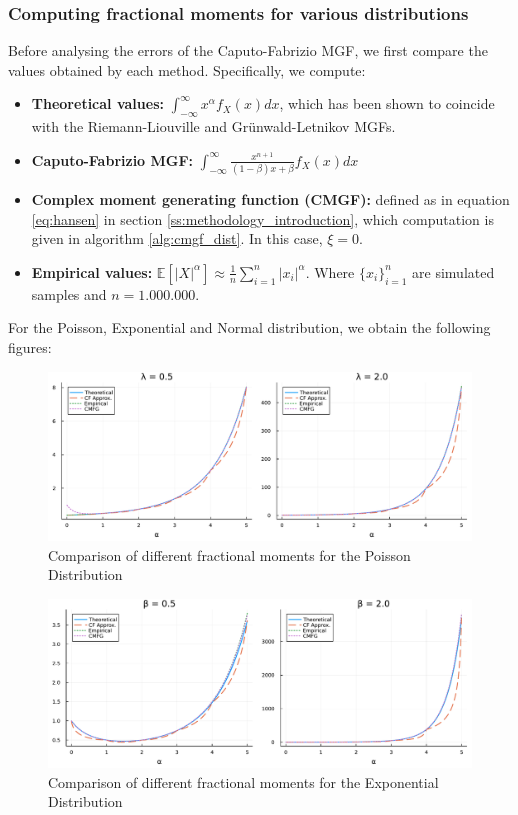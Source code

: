 \subsubsection{Computing fractional moments for various distributions}
Before analysing the errors of the Caputo-Fabrizio MGF, we first compare the values obtained by each method. Specifically, we compute:
\begin{itemize}
    \item \textbf{Theoretical values:} \(\displaystyle \int_{-\infty}^{\infty} x^\alpha  f_X(x) dx\), which has been shown to coincide with the Riemann-Liouville and Grünwald-Letnikov MGFs.
    \item \textbf{Caputo-Fabrizio MGF:} \(\displaystyle \int_{-\infty}^{\infty}  \frac{x^{n+1} }{(1 - \beta)x + \beta} f_X(x) dx\)
    \item \textbf{Complex moment generating function (CMGF):} defined as in equation \ref{eq:hansen} in section \ref{ss:methodology_introduction}, which computation is given in algorithm \ref{alg:cmgf_dist}. In this case, \(\xi = 0\).
    \item \textbf{Empirical values:} \(\displaystyle\mathbb{E}[|X|^\alpha] \approx \frac{1}{n} \sum_{i=1}^{n} |x_i|^\alpha\). Where \(\{x_i\}_{i=1}^{n}\) are simulated samples and \(n = 1.000.000\).
\end{itemize}

For the Poisson, Exponential and Normal distribution, we obtain the following figures: 
\begin{figure}[H]
    \centering
    \includegraphics[width=1.1\textwidth]{figures/value_comparison_poisson.pdf}
    \caption{Comparison of different fractional moments for the Poisson Distribution}
    \label{fig:poisson_plot_values}
\end{figure}

\begin{figure}[H]
    \centering
    \includegraphics[width=1.1\textwidth]{figures/value_comparison_exponential.pdf}
    \caption{Comparison of different fractional moments for the Exponential Distribution}
    \label{fig:exponential_plot_values}
\end{figure}

